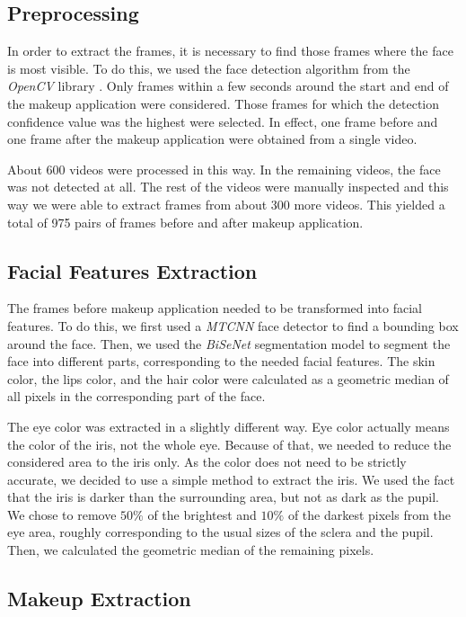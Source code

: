 \documentclass[conference]{IEEEtran}
\begin{document}
\subsection{Preprocessing}

In order to extract the frames, it is necessary to find those frames where the face is most visible.
To do this, we used the face detection algorithm from the \emph{OpenCV} library \cite{opencv}.
Only frames within a few seconds around the start and end of the makeup application were considered.
Those frames for which the detection confidence value was the highest were selected.
In effect, one frame before and one frame after the makeup application were obtained from a single video.

About 600 videos were processed in this way.
In the remaining videos, the face was not detected at all.
The rest of the videos were manually inspected and this way we were able to extract frames from about 300 more videos.
This yielded a total of 975 pairs of frames before and after makeup application.

\subsection{Facial Features Extraction}

The frames before makeup application needed to be transformed into facial features.
To do this, we first used a \emph{MTCNN} face detector \cite{MTCNN-Zhang} to find a bounding box around the face.
Then, we used the \emph{BiSeNet} \cite{BiSeNet} segmentation model to segment the face into different parts, corresponding to the needed facial features.
The skin color, the lips color, and the hair color were calculated as a geometric median of all pixels in the corresponding part of the face.

The eye color was extracted in a slightly different way.
Eye color actually means the color of the iris, not the whole eye.
Because of that, we needed to reduce the considered area to the iris only.
As the color does not need to be strictly accurate, we decided to use a simple method to extract the iris.
We used the fact that the iris is darker than the surrounding area, but not as dark as the pupil.
We chose to remove $50\%$ of the brightest and $10\%$ of the darkest pixels from the eye area, roughly corresponding to the usual sizes of the sclera and the pupil.
Then, we calculated the geometric median of the remaining pixels.

\subsection{Makeup Extraction}
\end{document}
